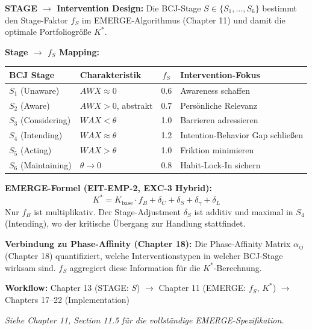 \begin{tcolorbox}[
    colback=blue!5!white,
    colframe=blue!75!black,
    title={\textbf{Cross-Reference: EMERGE Algorithm (Chapter 11, EIT-EMP)}},
    fonttitle=\bfseries
]
\textbf{STAGE $\rightarrow$ Intervention Design:} Die BCJ-Stage $S \in \{S_1, ..., S_6\}$ bestimmt den Stage-Faktor $f_S$ im EMERGE-Algorithmus (Chapter 11) und damit die optimale Portfoliogröße $K^*$.

\medskip
\textbf{Stage $\rightarrow$ $f_S$ Mapping:}
\begin{center}
\begin{tabular}{llcl}
\textbf{BCJ Stage} & \textbf{Charakteristik} & \textbf{$f_S$} & \textbf{Intervention-Fokus} \\
\midrule
$S_1$ (Unaware) & $AWX \approx 0$ & 0.6 & Awareness schaffen \\
$S_2$ (Aware) & $AWX > 0$, abstrakt & 0.7 & Persönliche Relevanz \\
$S_3$ (Considering) & $WAX < \theta$ & 1.0 & Barrieren adressieren \\
$S_4$ (Intending) & $WAX \approx \theta$ & 1.2 & Intention-Behavior Gap schließen \\
$S_5$ (Acting) & $WAX > \theta$ & 1.0 & Friktion minimieren \\
$S_6$ (Maintaining) & $\theta \to 0$ & 0.8 & Habit-Lock-In sichern \\
\end{tabular}
\end{center}

\medskip
\textbf{EMERGE-Formel (EIT-EMP-2, EXC-3 Hybrid):}
\[
K^* = K_{\text{base}} \cdot f_B + \delta_C + \boxed{\delta_S} + \delta_\gamma + \delta_L
\]
Nur $f_B$ ist multiplikativ. Der Stage-Adjustment $\delta_S$ ist additiv und maximal in $S_4$ (Intending), wo der kritische Übergang zur Handlung stattfindet.

\medskip
\textbf{Verbindung zu Phase-Affinity (Chapter 18):}
Die Phase-Affinity Matrix $\alpha_{ij}$ (Chapter 18) quantifiziert, welche Interventionstypen in welcher BCJ-Stage wirksam sind. $f_S$ aggregiert diese Information für die $K^*$-Berechnung.

\medskip
\textbf{Workflow:} Chapter 13 (STAGE: $S$) $\rightarrow$ Chapter 11 (EMERGE: $f_S$, $K^*$) $\rightarrow$ Chapters 17--22 (Implementation)

\medskip
\textit{Siehe Chapter 11, Section 11.5 für die vollständige EMERGE-Spezifikation.}
\end{tcolorbox}


